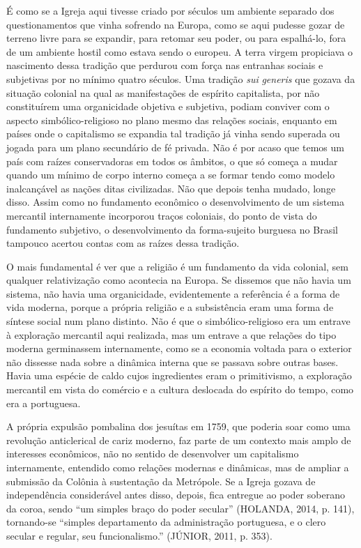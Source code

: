 É como se a Igreja aqui tivesse criado por séculos um ambiente separado
dos questionamentos que vinha sofrendo na Europa, como se aqui pudesse
gozar de terreno livre para se expandir, para retomar seu poder, ou para
espalhá-lo, fora de um ambiente hostil como estava sendo o europeu. A
terra virgem propiciava o nascimento dessa tradição que perdurou com
força nas entranhas sociais e subjetivas por no mínimo quatro séculos.
Uma tradição \emph{sui} \emph{generis} que gozava da situação colonial
na qual as manifestações de espírito capitalista, por não constituírem
uma organicidade objetiva e subjetiva, podiam conviver com o aspecto
simbólico-religioso no plano mesmo das relações sociais, enquanto em
países onde o capitalismo se expandia tal tradição já vinha sendo
superada ou jogada para um plano secundário de fé privada. Não é por
acaso que temos um país com raízes conservadoras em todos os âmbitos, o
que só começa a mudar quando um mínimo de corpo interno começa a se
formar tendo como modelo inalcançável as nações ditas civilizadas. Não
que depois tenha mudado, longe disso. Assim como no fundamento econômico
o desenvolvimento de um sistema mercantil internamente incorporou traços
coloniais, do ponto de vista do fundamento subjetivo, o desenvolvimento
da forma-sujeito burguesa no Brasil tampouco acertou contas com as
raízes dessa tradição.

O mais fundamental é ver que a religião é um fundamento da vida
colonial, sem qualquer relativização como acontecia na Europa. Se
dissemos que não havia um sistema, não havia uma organicidade,
evidentemente a referência é a forma de vida moderna, porque a própria
religião e a subsistência eram uma forma de síntese social num plano
distinto. Não é que o simbólico-religioso era um entrave à exploração
mercantil aqui realizada, mas um entrave a que relações do tipo moderna
germinassem internamente, como se a economia voltada para o exterior não
dissesse nada sobre a dinâmica interna que se passava sobre outras
bases. Havia uma espécie de caldo cujos ingredientes eram o
primitivismo, a exploração mercantil em vista do comércio e a cultura
deslocada do espírito do tempo, como era a portuguesa.

A própria expulsão pombalina dos jesuítas em 1759, que poderia soar como
uma revolução anticlerical de cariz moderno, faz parte de um contexto
mais amplo de interesses econômicos, não no sentido de desenvolver um
capitalismo internamente, entendido como relações modernas e dinâmicas,
mas de ampliar a submissão da Colônia à sustentação da Metrópole. Se a
Igreja gozava de independência considerável antes disso, depois, fica
entregue ao poder soberano da coroa, sendo ``um simples braço do poder
secular'' (HOLANDA, 2014, p. 141), tornando-se ``simples departamento da
administração portuguesa, e o clero secular e regular, seu
funcionalismo.'' (JÚNIOR, 2011, p. 353).


